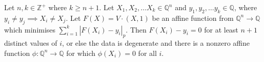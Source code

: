 
\begin{thm}
  \label{core-theorem}
  Let $n, k \in \mathbb{Z}^+$ where $k \ge n+1$.
  Let $X_1, X_2, \ldots X_k \in \mathbb{Q}^n$ and
  $y_1, y_2, \ldots y_k \in \mathbb{Q}$, where
$y_i \ne y_j \implies X_i \ne X_j$.
  Let $F(X) = V \cdot (X,1)$ be an affine function from $\mathbb{Q}^n \rightarrow \mathbb{Q}$ which minimises $\sum_{i=1}^{k} \left|F(X_i) - y_i\right|_p$.
Then $F(X_i) - y_i = 0$ for at least
$n+1$ distinct values of $i$, or else the data is degenerate and there is a nonzero affine function $\phi : \mathbb{Q}^n \rightarrow \mathbb{Q}$ for which $\phi(X_i) = 0$ for all $i$.
\end{thm}
